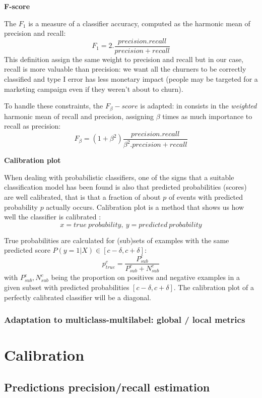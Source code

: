 \textbf{F-score}

The $F_1$ is a measure of a classifier accuracy, computed as the harmonic mean of precision and recall: $$F_1= 2. \frac{precision.recall}{precision+recall}$$\tabularnewline
This definition assign the same weight to precision and recall but in our case, recall is more valuable than precision: we want all the churners to be correctly classified and type I error has less monetary impact (people may be targeted for a marketing campaign even if they weren't about to churn).

To handle these constraints, the $F_\beta-score$ is adapted: in consists in the \textit{weighted} harmonic mean of recall and precision, assigning $\beta$ times as much importance to recall as precision: $$F_\beta = (1+\beta^2) \frac{precision.recall}{\beta^2.precision+recall}$$

\textbf{Calibration plot} 

When dealing with probabilistic classifiers, one of the signs that a suitable classification model has been found is also that predicted probabilities (scores) are well calibrated, that is that a fraction of about $p$ of events with predicted probability $p$ actually occurs. Calibration plot is a method that shows us how well the classifier is calibrated \cite{VC06}: $$x = true\ probability,\ y=predicted\ probability$$

True probabilities are calculated for (sub)sets of examples with the same predicted score $P(y=1|X) \in [c-\delta, c+\delta]$: $$ p_{true}^c = \frac{P_{sub}^c}{P_{sub}^c + N_{sub}^c}$$ with $P_{sub}^c, N_{sub}^c$ being the proportion on positives and negative examples in a given subset with predicted probabilities $[c-\delta, c+\delta]$. The calibration plot of a perfectly calibrated classifier will be a diagonal.



\subsubsection{Adaptation to multiclass-multilabel: global / local metrics}



\section{Calibration}

\subsection{Predictions precision/recall estimation}

